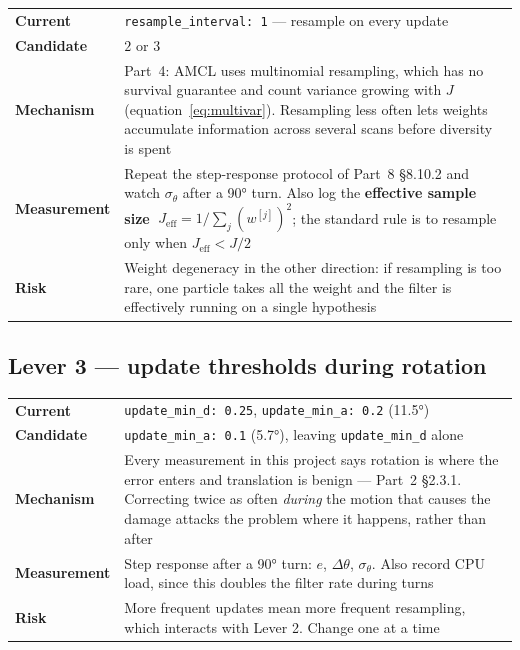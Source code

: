\documentclass[11pt,a4paper]{report}
\newcommand{\term}[1]{\textcolor{rust}{\textbf{#1}}}
\newcommand{\file}[1]{\texttt{\small #1}}
\begin{document}
\begin{center}
\small
\begin{tabular}{@{}p{}p{}@{}}
\toprule
\textbf{Current} & \file{resample\_interval: 1} --- resample on every update \\
\textbf{Candidate} & $2$ or $3$ \\
\textbf{Mechanism} & Part~4: AMCL uses multinomial resampling, which has no
  survival guarantee and count variance growing with $J$
  (equation~\eqref{eq:multivar}). Resampling less often lets weights accumulate
  information across several scans before diversity is spent \\
\textbf{Measurement} & Repeat the step-response protocol of Part~8 \S8.10.2 and
  watch $\sigma_\theta$ after a \ang{90} turn. Also log the
  \term{effective sample size} $\;J_{\text{eff}} = 1 / \sum_j (w^{[j]})^2$;
  the standard rule is to resample only when $J_{\text{eff}} < J/2$ \\
\textbf{Risk} & Weight degeneracy in the other direction: if resampling is too
  rare, one particle takes all the weight and the filter is effectively running
  on a single hypothesis \\
\bottomrule
\end{tabular}
\end{center}

\subsection{Lever 3 --- update thresholds during rotation}

\begin{center}
\small
\begin{tabular}{@{}p{}p{}@{}}
\toprule
\textbf{Current} & \file{update\_min\_d: 0.25}, \file{update\_min\_a: 0.2} (\ang{11.5}) \\
\textbf{Candidate} & \file{update\_min\_a: 0.1} (\ang{5.7}), leaving
  \file{update\_min\_d} alone \\
\textbf{Mechanism} & Every measurement in this project says rotation is where
  the error enters and translation is benign --- Part~2 \S2.3.1. Correcting
  twice as often \emph{during} the motion that causes the damage attacks the
  problem where it happens, rather than after \\
\textbf{Measurement} & Step response after a \ang{90} turn: $e$,
  $\Delta\theta$, $\sigma_\theta$. Also record CPU load, since this doubles the
  filter rate during turns \\
\textbf{Risk} & More frequent updates mean more frequent resampling, which
  interacts with Lever 2. Change one at a time \\
\bottomrule
\end{tabular}
\end{center}
\end{document}
